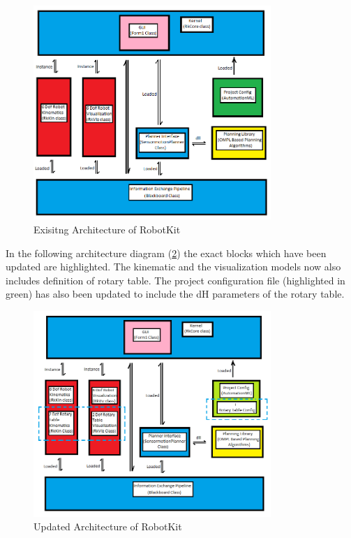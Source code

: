 \begin{figure}[!htbp] %
 \centering
   \includegraphics[width=9cm]{images/Original_arch.png}
   \caption[Exisitng Architecture of RobotKit(cite rk)]
   {Exisitng Architecture of RobotKit}  
\label{fig:img9}
\end{figure}

In the following architecture diagram (\ref{fig:img10}) the exact blocks which have been updated are highlighted. The kinematic and the visualization models now also includes definition of rotary table. The project configuration file (highlighted in green) has also been updated to include the dH parameters of the rotary table. 
\begin{figure}[!htbp] %
 \centering
   \includegraphics[width=9cm]{images/new_arch.png}
   \caption[Updated Architecture of RobotKit(cite rk)]
   {Updated Architecture of RobotKit}  
\label{fig:img10}
\end{figure}
 

